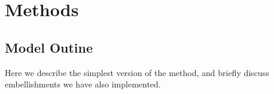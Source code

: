\documentclass[11pt]{article}
\def\lfdr{\textit{lfdr}}
\def\bhat{\hat{\beta}}
\def\ash{{\tt ash}\xspace}
\begin{document}

\def\df{df}
\def\FDR{\text{FDR}}
\def\fdr{\text{\lfdr}}
\def\FSR{\text{FSR}}
\def\fsr{\text{lfsr}}

 \section*{Methods}

 \subsection*{Model Outine}
 
Here we describe the simplest version of the method, and briefly discuss embellishments we have also implemented.
\end{document}

